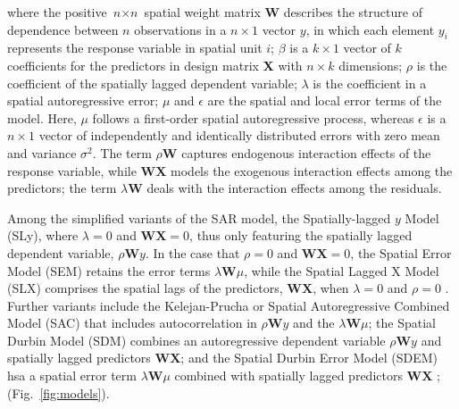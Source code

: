 \documentclass[lineno,pdflatex,sn-basic]{sn-jnl}%
\theoremstyle{thmstyleone}%
\theoremstyle{thmstyletwo}%
\theoremstyle{thmstylethree}%
\begin{document}
where the positive $\textit{n}\times\textit{n}$ spatial weight matrix \textbf{W} describes the structure of dependence between $n$ observations in a $n\times1$ vector $y$, in which each element $y_i$ represents the response variable in spatial unit $i$; 
$\beta$ is a $k\times1$ vector of $k$ coefficients for the predictors in design matrix \textbf{X} with $n\times k$ dimensions; $\rho$ is the coefficient of the spatially lagged dependent variable; $\lambda$ is the coefficient in a spatial autoregressive error; 
$\mu$ and $\epsilon$ are the spatial and local error terms of the model. 
Here, $\mu$ follows a first-order spatial autoregressive process, whereas $\epsilon$ is a $n\times1$ vector of independently and identically distributed errors with zero mean and variance $\sigma^2$. 
The term $\rho \textbf{W}$ captures endogenous interaction effects of the response variable, while $\textbf{W} \textbf{X}$ models the exogenous interaction effects among the predictors; the term $\lambda \textbf{W}$ deals with the interaction effects among the residuals.

Among the simplified variants of the SAR model, the Spatially-lagged $y$ Model (SLy), where $\lambda=0$ and $\textbf{W}\textbf{X}=0$, thus only featuring the spatially lagged dependent variable, $\rho \textbf{W}y$. 
In the case that $\rho=0$ and $\textbf{W}\textbf{X}=0$, the Spatial Error Model (SEM) retains the error terms $\lambda \textbf{W} \mu$, while the Spatial Lagged X Model (SLX) comprises the spatial lags of the predictors, $\textbf{W}\textbf{X}$, when  $\lambda=0$ and $\rho=0$ \citep{elhorst2013spatial}.
Further variants include the Kelejan-Prucha or Spatial Autoregressive Combined Model (SAC) that includes autocorrelation in $\rho \textbf{W} y$ and the $\lambda \textbf{W} \mu$; the Spatial Durbin Model (SDM) combines an autoregressive dependent variable $\rho \textbf{W} y$ and spatially lagged predictors $\textbf{W}\textbf{X}$; and the Spatial Durbin Error Model (SDEM) hsa a spatial error term $\lambda \textbf{W} \mu$ combined with spatially lagged predictors $\textbf{W}\textbf{X}$ \citep{elhorst2022dynamic, anselin2022spatial}; (Fig.~\ref{fig:models}).
\end{document}
